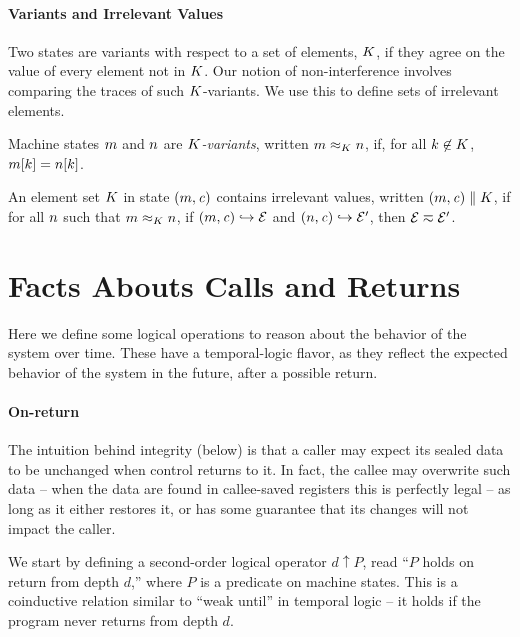 \documentclass[10pt,conference]{ieeetran}%
\theoremstyle{definition}
\begin{document}
\paragraph*{Variants and Irrelevant Values}

Two states are variants with respect to a set of elements, \(K\),
if they agree on the value of every element not in \(K\). Our
notion of non-interference involves comparing the traces of such
\(K\)-variants. We use this to define sets of irrelevant elements.

 Machine states \(m\) and \(n\) are {\em \(K\)-variants},
written \(m \approx_K n\), if, for
all \(k \not \in K\), \(m[k] = n[k]\).

 An element set \(K\) in state \((m,\mathit{c})\) contains
irrelevant values, written \((m,\mathit{c}) \parallel K\), if for all
\(n\) such that \(m \approx_{K} n\), if 
\((m,\mathit{c}) \hookrightarrow \mathcal{E}\) and
\((n,\mathit{c}) \hookrightarrow \mathcal{E}'\), then
\(\mathcal{E} \eqsim \mathcal{E}'\).

\section{Facts Abouts Calls and Returns}
\label{sec:facts}

Here we define some logical operations to reason about the behavior of the
system over time. These have a temporal-logic flavor, as they reflect
the expected behavior of the system in the future, after a possible return.

\paragraph*{On-return}

The intuition behind integrity (below) is that a caller may expect its
sealed data to be unchanged when control returns to it. In fact, the callee
may overwrite such data -- when the data are found in callee-saved registers
this is perfectly legal -- as long as it either restores it, or has some guarantee
that its changes will not impact the caller.

We start by defining a second-order logical operator
\(d \uparrow P\), read ``\(P\) holds on return from depth \(d\),''
where \(P\) is a predicate on machine states. This is a coinductive relation
similar to ``weak until'' in temporal logic -- it holds if the program never
returns from depth \(d\).
\end{document}
